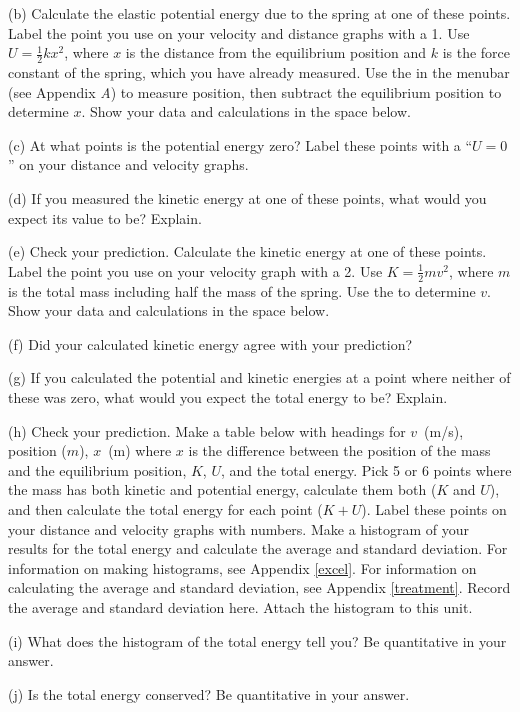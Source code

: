 \pagebreak[2]
(b) Calculate the elastic potential energy due to the spring at one of these
points. Label the point you use on your velocity and distance graphs with a
1. Use $U = \frac{1}{2}kx^{2}$, where  $x$ is the distance from the equilibrium 
position and $k$ is the force constant of the spring, which you have already 
measured. Use the  in the menubar (see Appendix {\it A})
to measure position, then subtract the 
equilibrium position to determine $x$. Show your data and calculations 
in the space below. 
\answerspace{20mm}

(c) At what points is the potential energy zero? Label these points with a ``$U=0$''
on your distance and velocity graphs.

(d) If you measured the kinetic energy at one of these points, what would you
expect its value to be? Explain.
\answerspace{15mm}

\pagebreak[2]
(e) Check your prediction. Calculate the kinetic energy at one of these points.
Label the point you use on your velocity graph with a 2. Use 
$K = \frac{1}{2} mv^{2}$, where $m$ is the total mass including half the mass of 
the spring. Use the  to determine $v$. Show your data and 
calculations in the space below.
\answerspace{20mm}

(f) Did your calculated kinetic energy agree with your prediction?
\answerspace{15mm}

(g) If you calculated the potential and kinetic energies at a point where 
neither of these was zero, what would you expect the total energy to be? 
Explain.
\answerspace{20mm}

\pagebreak[3]
(h) Check your prediction. Make a table below with headings for $v$~(m/s), 
position ($m$), $x$~(m) where $x$ is the difference between the position
of the mass and the equilibrium position, $K$, $U$, and the total energy.
Pick 5 or 6 points where the mass has both kinetic and
potential energy, calculate them both ($K$ and $U$), and then calculate the 
total energy for each point ($K+U$). Label these points on your distance
and velocity graphs with numbers. 
Make a histogram of your results for the total energy and calculate the 
average and standard deviation.
For information on making histograms, see Appendix \ref{excel}. For information 
on calculating the average and standard deviation, see Appendix \ref{treatment}. 
Record the average and standard deviation here.
Attach the histogram to this unit.
\answerspace{80mm}

(i) What does the histogram of the total energy tell you? Be quantitative in 
your answer.
\answerspace{20mm}

(j) Is the total energy conserved?  Be quantitative in your answer.
\answerspace{20mm}

